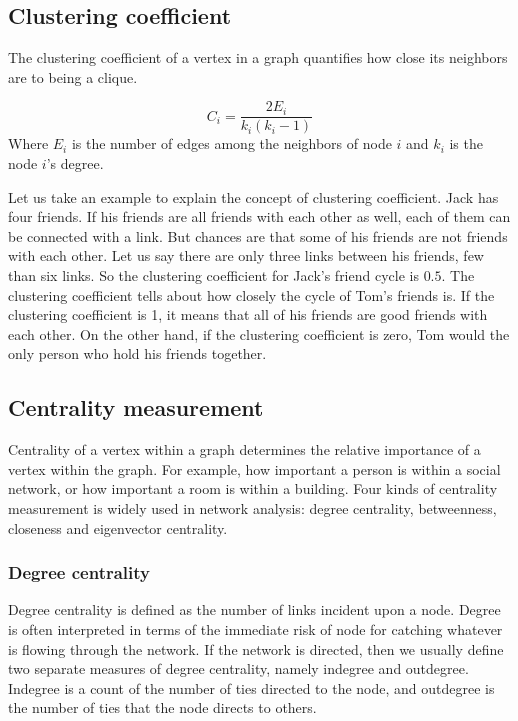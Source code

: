\subsection{Clustering coefficient}
The clustering coefficient of a vertex in a graph quantifies how close its neighbors are to being a clique\cite{www-small}. 

\begin{equation}
C_i=\frac{2E_i}{k_i(k_i-1)}
\end {equation}
Where $E_i$ is the number of edges among the neighbors of node $i$ and $k_i$ is the node $i$'s degree. 

Let us take an example to explain the concept of clustering coefficient. Jack has four friends. If his friends are all friends with each other as well, each of them can be connected with a link. But chances are that some of his friends are not friends with each other. Let us say there are only three links between his friends, few than six links. So the clustering coefficient for Jack's friend cycle is $0.5$. The clustering coefficient tells about how closely the cycle of Tom's friends is. If the clustering coefficient is 1, it means that all of his friends are good friends with each other. On the other hand, if the clustering coefficient is zero, Tom would the only person who hold his friends together.

\subsection{Centrality measurement}

Centrality of a vertex within a graph determines the relative importance of a vertex within the graph\cite{www-centrality}. For example, how important a person is within a social network, or how important a room is within a building. Four kinds of centrality measurement is widely used in network analysis: degree centrality, betweenness, closeness and eigenvector centrality.

\subsubsection{Degree centrality}
Degree centrality is defined as the number of links incident upon a node. Degree is often interpreted in terms of the immediate risk of node for catching whatever is flowing through the network. If the network is directed, then we usually define two separate measures of degree centrality, namely indegree and outdegree. Indegree is a count of the number of ties directed to the node, and outdegree is the number of ties that the node directs to others.
